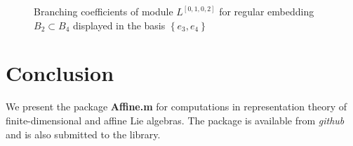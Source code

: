 \documentclass[preprint,12pt]{elsarticle}
\begin{document}
\begin{figure}[h]
  \label{branching-b4-b2}
  \noindent{}
  \caption{Branching coefficients of module $L^{\left[0,1,0,2\right]}$ for regular embedding $B_{2}\subset B_{4}$ displayed in the basis $\left\{e_3,e_4\right\}$}
\end{figure}


\section{Conclusion}
\label{sec:conclusion}
We present the package {\bf Affine.m} for computations in representation theory of finite-dimensional and affine Lie algebras. The package is available from {\it github} and is also submitted to the library. 

\newpage












\end{document}
